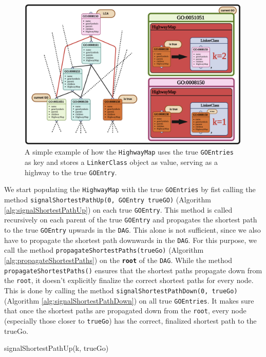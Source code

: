 \documentclass[12pt]{article}
\begin{document}
\begin{figure}[htpb]
    \centering
    \includegraphics[width=0.99\textwidth]{./figures/Highway.png}
    \caption{A simple example of how the \texttt{HighwayMap} uses the true \texttt{GOEntries} as key and stores a \texttt{LinkerClass} object as value,
    serving as a highway to the true \texttt{GOEntry}.}
    \label{fig:-figures-Highway-png}
\end{figure}


We start populating the \texttt{HighwayMap} with the true \texttt{GOEntries}
by fist calling the method \texttt{signalShortestPathUp(0, GOEntry trueGO)} (Algorithm \ref{alg:signalShortestPathUp}) on each true \texttt{GOEntry}.
This method is called recursively on each parent of the true \texttt{GOEntry} and
propagates the shortest path to the true \texttt{GOEntry} upwards in the \texttt{DAG}.
This alone is not sufficient, since we also have to propagate the shortest path
downwards in the \texttt{DAG}. 
For this purpose, we call the method \texttt{propagateShortestPaths(trueGo)} (Algorithm \ref{alg:propagateShortestPaths}) on the \texttt{\textbf{root}} 
of the \texttt{DAG}.
While the method \texttt{propagateShortestPaths()} ensures that the shortest paths propagate 
down from the \texttt{root}, it doesn't explicitly finalize the correct shortest 
paths for every node. This is done by calling the method \texttt{signalShortestPathDown(0, trueGo)} (Algorithm \ref{alg:signalShortestPathDown}) on all true \texttt{GOEntries}.
It makes sure that once the shortest paths are propagated down from the \texttt{root}, 
every node (especially those closer to \texttt{trueGo}) has the correct, 
finalized shortest path to the trueGo.

\begin{algorithm}[!htbp]
\caption{signalShortestPathUp(k, trueGo)}\label{alg:signalShortestPathUp}
\end{algorithm}
\end{document}
